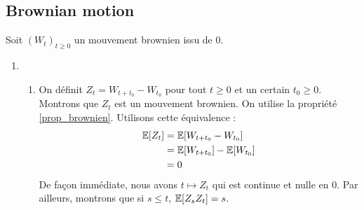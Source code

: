 \subsection{Brownian motion}
\renewcommand{\wt}{W_t}
Soit $(\wt)_{t \geq 0}$ un mouvement brownien issu de 0.

\begin{enumerate}
\item 
  \begin{enumerate}
    \item On définit $Z_t = W_{t+t_0} - W_{t_0}$ pour tout $t \geq 0$ et un certain $t_0 \geq 0$. Montrons que $Z_t$ est un mouvement brownien. On utilise la propriété \ref{prop_brownien}. Utilisons cette équivalence :
      \newcommand{\wtt}{W_{t+t_0}}
      \renewcommand{\wt}{W_{t_0}}
      \begin{equation*}
      \begin{split}
        \E[Z_t] &= \E[ \wtt - \wt] \\
        &= \E[\wtt] - \E[\wt] \\
        &= 0
      \end{split}
      \end{equation*}
      De façon immédiate, nous avons $t \mapsto Z_t$ qui est continue et nulle en 0.
      Par ailleurs, montrons que si $s \leq t$, $\mathbb{E}[Z_sZ_t] = s$.


\end{enumerate}
\end{enumerate}
